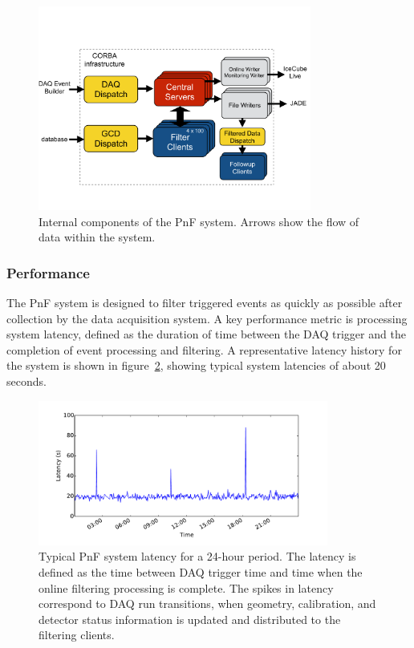 \begin{figure}[!ht]
 \centering
 \includegraphics[width=0.8\textwidth]{graphics/online/pnf/PnF_Internals.pdf}
 \caption{Internal components of the PnF
   system.  Arrows show the flow of data within the system.}
 \label{fig:online_pnf_internals}
\end{figure}

\subsubsection{Performance}

The PnF system is designed to filter triggered events as quickly as
possible after collection by the data acquisition 
system.  A key performance metric is processing system latency, defined as the duration
of time between the DAQ trigger and the completion of event
processing and filtering.  A representative latency history for the system is
shown in figure~\ref{fig:online_pnf_latency}, showing typical system
latencies of about 20 seconds.

\begin{figure}[!ht]
 \centering
 \includegraphics[width=0.85\textwidth]{graphics/online/pnf/pnf_latency_160627.pdf}
 \caption{Typical PnF system latency for a
   24-hour period.  The latency is defined as the time between DAQ trigger
   time and time when the online filtering processing is complete.  The
   spikes in latency correspond to DAQ run transitions, when
   geometry, calibration, and detector status information is updated and
   distributed to the filtering clients.}
 \label{fig:online_pnf_latency}
\end{figure}

